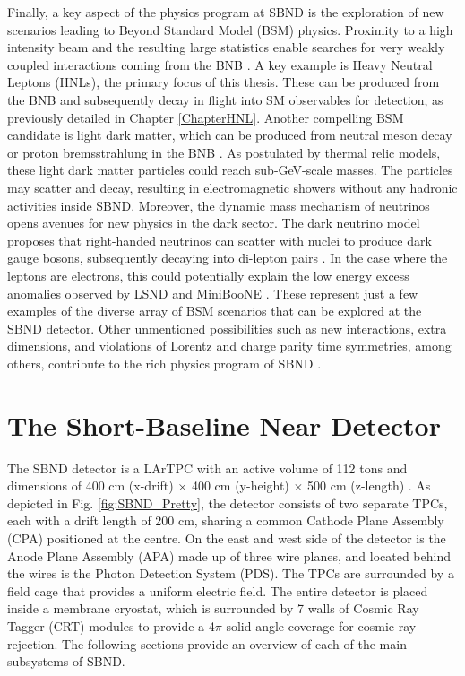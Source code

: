 Finally, a key aspect of the physics program at SBND is the exploration of new scenarios leading to Beyond Standard Model (BSM) physics. 
Proximity to a high intensity beam and the resulting large statistics enable searches for very weakly coupled interactions coming from the BNB \cite{SBNProgram}.
A key example is Heavy Neutral Leptons (HNLs), the primary focus of this thesis.
These can be produced from the BNB and subsequently decay in flight into SM observables for detection, as previously detailed in Chapter \ref{ChapterHNL}.
Another compelling BSM candidate is light dark matter, which can be produced from neutral meson decay or proton bremsstrahlung in the BNB \cite{LightDarkMatter}. 
As postulated by thermal relic models, these light dark matter particles could reach sub-GeV-scale masses. 
The particles may scatter and decay, resulting in electromagnetic showers without any hadronic activities inside SBND.
Moreover, the dynamic mass mechanism of neutrinos opens avenues for new physics in the dark sector. 
The dark neutrino model proposes that right-handed neutrinos can scatter with nuclei to produce dark gauge bosons, subsequently decaying into di-lepton pairs \cite{DarkNeutrino}. 
In the case where the leptons are electrons, this could potentially explain the low energy excess anomalies observed by LSND and MiniBooNE \cite{DarkNeutrinoLEE}.
These represent just a few examples of the diverse array of BSM scenarios that can be explored at the SBND detector. 
Other unmentioned possibilities such as new interactions, extra dimensions, and violations of Lorentz and charge parity time symmetries, among others, contribute to the rich physics program of SBND \cite{SBNProgram}.

\section{The Short-Baseline Near Detector}
\label{sec4SBND}

The SBND detector is a LArTPC with an active volume of 112 tons and dimensions of 400 cm (x-drift) $\times$ 400 cm (y-height) $\times$ 500 cm (z-length) \cite{SBNProposal}.
As depicted in Fig. \ref{fig:SBND_Pretty}, the detector consists of two separate TPCs, each with a drift length of 200 cm, sharing a common Cathode Plane Assembly (CPA) positioned at the centre.
On the east and west side of the detector is the Anode Plane Assembly (APA) made up of three wire planes, and located behind the wires is the Photon Detection System (PDS).
The TPCs are surrounded by a field cage that provides a uniform electric field.
The entire detector is placed inside a membrane cryostat, which is surrounded by 7 walls of Cosmic Ray Tagger (CRT) modules to provide a 4$\pi$ solid angle coverage for cosmic ray rejection.
The following sections provide an overview of each of the main subsystems of SBND.

